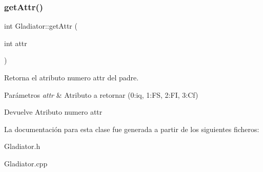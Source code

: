 \subsubsection{\texorpdfstring{get\+Attr()}{getAttr()}}
{\footnotesize\ttfamily int Gladiator\+::get\+Attr (\begin{DoxyParamCaption}\item[{int}]{attr }\end{DoxyParamCaption})}

Retorna el atributo numero attr del padre. 
\begin{DoxyParams}{Parámetros}
{\em attr} & Atributo a retornar (0\+:iq, 1\+:FS, 2\+:FI, 3\+:Cf) \\
\hline
\end{DoxyParams}
\begin{DoxyReturn}{Devuelve}
Atributo numero attr 
\end{DoxyReturn}


La documentación para esta clase fue generada a partir de los siguientes ficheros\+:\begin{DoxyCompactItemize}
\item 
Gladiator.\+h\item 
Gladiator.\+cpp\end{DoxyCompactItemize}
